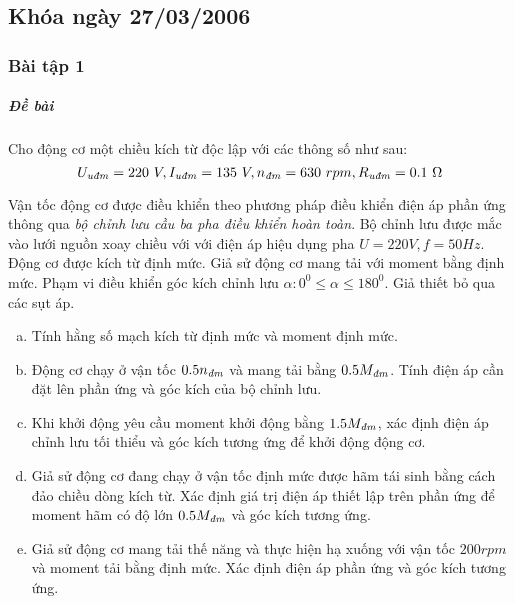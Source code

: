 \documentclass[12pt,a4paper]{article}
\begin{document}
\subsection{Khóa ngày 27/03/2006}
\subsubsection{Bài tập 1}
\subparagraph{Đề bài} Cho động cơ một chiều kích từ độc lập với các thông số như sau: $$\vqitalic{U} = 220 \unit{V}, \vqitalic{I} = 135 \unit{V}, \vitalic{n} = 630 \unit{rpm}, \vqitalic{R} = 0.1 \unit{\Omega}$$

Vận tốc động cơ được điều khiển theo phương pháp điều khiển điện áp phần ứng thông qua \textit{bộ chỉnh lưu cầu ba pha điều khiển hoàn toàn}. Bộ chỉnh lưu được mắc vào lưới nguồn xoay chiều với với điện áp hiệu dụng pha $U = 220 \unit{V}, f = 50 \unit{Hz}$. Động cơ được kích từ định mức. Giả sử động cơ mang tải với moment bằng định mức. Phạm vi điều khiển góc kích chỉnh lưu $\alpha: 0^0 \leq \alpha \leq  180^0$. Giả thiết bỏ qua các sụt áp.
\begin{enumerate}[a.]
\item Tính hằng số mạch kích từ định mức và moment định mức.
\item Động cơ chạy ở vận tốc $0.5 \vitalic{n}$ và mang tải bằng $0.5 \vitalic{M}$. Tính điện áp cần đặt lên phần ứng và góc kích của bộ chỉnh lưu.
\item Khi khởi động yêu cầu moment khởi động bằng $1.5 \vitalic{M}$, xác định điện áp chỉnh lưu tối thiểu và góc kích tương ứng để khởi động động cơ.
\item Giả sử động cơ đang chạy ở vận tốc định mức được hãm tái sinh bằng cách đảo chiều dòng kích từ. Xác định giá trị điện áp thiết lập trên phần ứng để moment hãm có độ lớn $0.5 \vitalic{M}$ và góc kích tương ứng.
\item Giả sử động cơ mang tải thế năng và thực hiện hạ xuống với vận tốc $200 \unit{rpm}$ và moment tải bằng định mức. Xác định điện áp phần ứng và góc kích tương ứng.
\end{enumerate}
\end{document}
